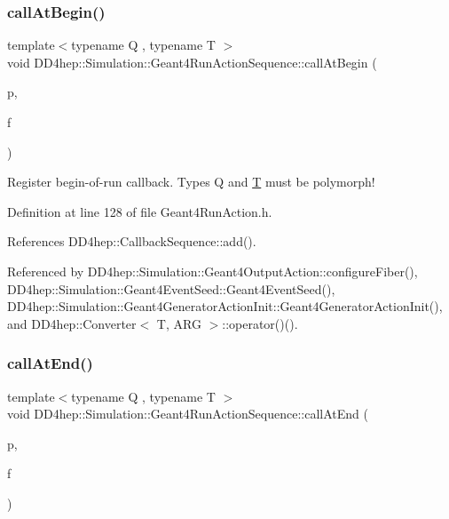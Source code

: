 \subsubsection{\texorpdfstring{call\+At\+Begin()}{callAtBegin()}}
{\footnotesize\ttfamily template$<$typename Q , typename T $>$ \\
void D\+D4hep\+::\+Simulation\+::\+Geant4\+Run\+Action\+Sequence\+::call\+At\+Begin (\begin{DoxyParamCaption}\item[{Q $\ast$}]{p,  }\item[{void(T\+::$\ast$)(const G4\+Run $\ast$)}]{f }\end{DoxyParamCaption})\hspace{0.3cm}{\ttfamily [inline]}}



Register begin-\/of-\/run callback. Types Q and \hyperlink{class_t}{T} must be polymorph! 



Definition at line 128 of file Geant4\+Run\+Action.\+h.



References D\+D4hep\+::\+Callback\+Sequence\+::add().



Referenced by D\+D4hep\+::\+Simulation\+::\+Geant4\+Output\+Action\+::configure\+Fiber(), D\+D4hep\+::\+Simulation\+::\+Geant4\+Event\+Seed\+::\+Geant4\+Event\+Seed(), D\+D4hep\+::\+Simulation\+::\+Geant4\+Generator\+Action\+Init\+::\+Geant4\+Generator\+Action\+Init(), and D\+D4hep\+::\+Converter$<$ T, A\+R\+G $>$\+::operator()().

\hypertarget{class_d_d4hep_1_1_simulation_1_1_geant4_run_action_sequence_a91c572acf97c51edd3e4a7e296064a49}{}\label{class_d_d4hep_1_1_simulation_1_1_geant4_run_action_sequence_a91c572acf97c51edd3e4a7e296064a49} 
\subsubsection{\texorpdfstring{call\+At\+End()}{callAtEnd()}}
{\footnotesize\ttfamily template$<$typename Q , typename T $>$ \\
void D\+D4hep\+::\+Simulation\+::\+Geant4\+Run\+Action\+Sequence\+::call\+At\+End (\begin{DoxyParamCaption}\item[{Q $\ast$}]{p,  }\item[{void(T\+::$\ast$)(const G4\+Run $\ast$)}]{f }\end{DoxyParamCaption})\hspace{0.3cm}{\ttfamily [inline]}}



